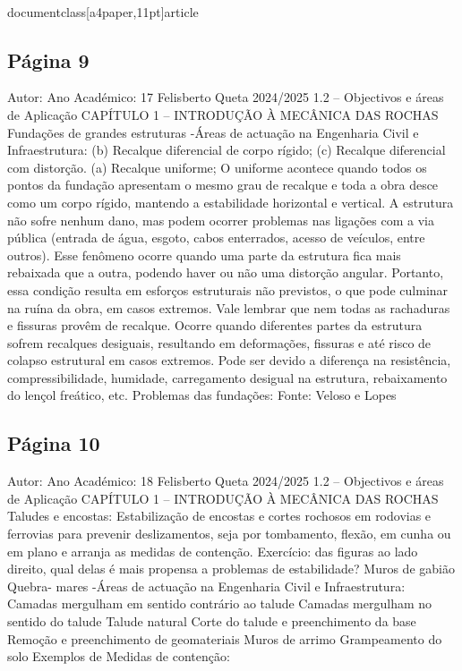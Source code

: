 \\documentclass[a4paper,11pt]{article}
\begin{document}
\subsection*{Página 9}
Autor:
Ano Académico:
17
Felisberto Queta
2024/2025
1.2 – Objectivos e áreas de Aplicação
CAPÍTULO 1 – INTRODUÇÃO À MECÂNICA DAS ROCHAS
Fundações de grandes estruturas
-Áreas de actuação na Engenharia Civil e Infraestrutura:
(b) Recalque diferencial de corpo 
rígido; 
(c) Recalque diferencial com 
distorção. 
(a) Recalque uniforme; 
O uniforme acontece quando todos os 
pontos da fundação apresentam o mesmo 
grau de recalque e toda a obra desce como 
um corpo rígido, mantendo a estabilidade 
horizontal e vertical. A estrutura não sofre 
nenhum dano, mas podem ocorrer problemas 
nas ligações com a via pública (entrada de 
água, esgoto, cabos enterrados, acesso de 
veículos, entre outros).
Esse fenômeno ocorre quando uma 
parte da estrutura fica mais rebaixada 
que a outra, podendo haver ou não uma 
distorção angular. Portanto, essa 
condição resulta em esforços estruturais 
não previstos, o que pode culminar na 
ruína da obra, em casos extremos. Vale 
lembrar que nem todas as rachaduras e 
fissuras provêm de recalque.
Ocorre quando diferentes partes da 
estrutura sofrem recalques desiguais, 
resultando em deformações, fissuras e 
até risco de colapso estrutural em 
casos extremos. Pode ser devido a 
diferença na resistência, 
compressibilidade, humidade, 
carregamento desigual na estrutura, 
rebaixamento do lençol freático, etc. 
Problemas das fundações:
Fonte: Veloso 
e Lopes



\subsection*{Página 10}
Autor:
Ano Académico:
18
Felisberto Queta
2024/2025
1.2 – Objectivos e áreas de Aplicação
CAPÍTULO 1 – INTRODUÇÃO À MECÂNICA DAS ROCHAS
Taludes e encostas:
Estabilização de encostas e cortes rochosos em rodovias e ferrovias para prevenir
deslizamentos, seja por tombamento, flexão, em cunha ou em plano e arranja as
medidas de contenção.
Exercício: das figuras ao lado direito,
qual delas é mais propensa a problemas
de estabilidade?
Muros
de
gabião
Quebra-
mares
-Áreas de actuação na Engenharia Civil e Infraestrutura:
Camadas
mergulham
em
sentido contrário ao talude
Camadas
mergulham
no
sentido do talude
Talude natural
Corte
do
talude
e
preenchimento da base
Remoção e preenchimento
de geomateriais
Muros
de
arrimo
Grampeamento
do solo
Exemplos
de
Medidas
de
contenção:
\end{document}
